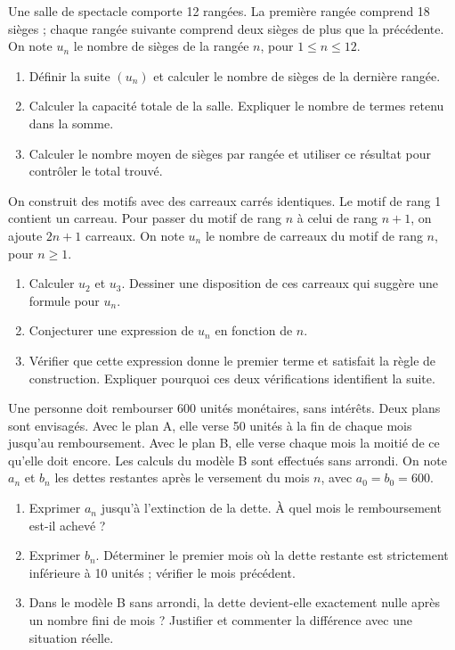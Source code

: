 Une salle de spectacle comporte 12 rangées. La première rangée comprend 18 sièges ; chaque rangée suivante comprend deux sièges de plus que la précédente. On note $u_n$ le nombre de sièges de la rangée $n$, pour $1\leq n\leq12$.
\begin{enumerate}[label=\arabic*.]
\item Définir la suite $(u_n)$ et calculer le nombre de sièges de la dernière rangée.
\item Calculer la capacité totale de la salle. Expliquer le nombre de termes retenu dans la somme.
\item Calculer le nombre moyen de sièges par rangée et utiliser ce résultat pour contrôler le total trouvé.
\end{enumerate}
On construit des motifs avec des carreaux carrés identiques. Le motif de rang 1 contient un carreau. Pour passer du motif de rang $n$ à celui de rang $n+1$, on ajoute $2n+1$ carreaux. On note $u_n$ le nombre de carreaux du motif de rang $n$, pour $n\geq1$.
\begin{enumerate}[label=\arabic*.]
\item Calculer $u_2$ et $u_3$. Dessiner une disposition de ces carreaux qui suggère une formule pour $u_n$.
\item Conjecturer une expression de $u_n$ en fonction de $n$.
\item Vérifier que cette expression donne le premier terme et satisfait la règle de construction. Expliquer pourquoi ces deux vérifications identifient la suite.
\end{enumerate}

Une personne doit rembourser 600 unités monétaires, sans intérêts. Deux plans sont envisagés. Avec le plan A, elle verse 50 unités à la fin de chaque mois jusqu’au remboursement. Avec le plan B, elle verse chaque mois la moitié de ce qu’elle doit encore. Les calculs du modèle B sont effectués sans arrondi. On note $a_n$ et $b_n$ les dettes restantes après le versement du mois $n$, avec $a_0=b_0=600$.
\begin{enumerate}[label=\arabic*.]
\item Exprimer $a_n$ jusqu’à l’extinction de la dette. À quel mois le remboursement est-il achevé ?
\item Exprimer $b_n$. Déterminer le premier mois où la dette restante est strictement inférieure à 10 unités ; vérifier le mois précédent.
\item Dans le modèle B sans arrondi, la dette devient-elle exactement nulle après un nombre fini de mois ? Justifier et commenter la différence avec une situation réelle.
\end{enumerate}
